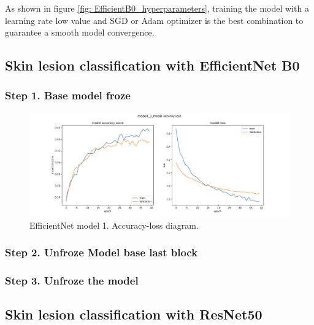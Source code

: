As shown in figure \ref{fig: EfficientB0_hyperparameters}, training the model with a learning rate low value and SGD or Adam optimizer is the best combination to guarantee a smooth model convergence.  






\newpage
\subsection{Skin lesion classification with EfficientNet B0}


\subsubsection{Step 1. Base model froze}


\begin{figure}[ht]
    \begin{center}
        \includegraphics[scale=0.40]{images/Building/Model Efficientnet/model1_1_model accuray-loss.png}
        \caption{EfficientNet model 1. Accuracy-loss diagram.}
    \label{fig: Model1_accuracy_loss}    
    \end{center}
\end{figure}

\newpage
\subsubsection{Step 2. Unfroze Model base last block}

\subsubsection{Step 3. Unfroze the model}

\newpage
\subsection{Skin lesion classification with ResNet50}

